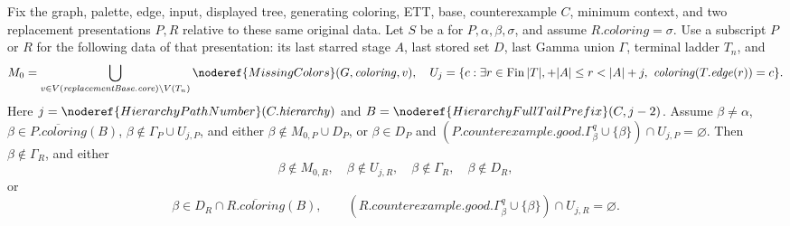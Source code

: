 \begin{lemma}
Fix the graph, palette, edge, input, displayed tree, generating coloring,
ETT, base, counterexample \(C\), minimum context, and two replacement
presentations \(P,R\) relative to these same original data.
Let \(S\) be a  for
\(P,\alpha,\beta,\sigma\), and assume \(R.\mathit{coloring}=\sigma\).
Use a subscript \(P\) or \(R\) for the following data of that
presentation: its last starred stage \(A\), last stored set \(D\),
last Gamma union \(\Gamma\), terminal ladder \(T_n\), and
\[
 M_0=\bigcup_{v\in V(\mathit{replacementBase.core})\setminus V(T_n)}
 \noderef{MissingColors}(G,\mathit{coloring},v),\quad
 U_j=\{c:\exists r\in\operatorname{Fin}|T|,+ |A|\le r<|A|+j,\ \mathit{coloring}(T.\mathit{edge}(r))=c\}.
\]
Here \(j=\noderef{HierarchyPathNumber}(C.\mathit{hierarchy})\) and
\(B=\noderef{HierarchyFullTailPrefix}(C,j-2)\).
Assume \(\beta\ne\alpha\), \(\beta\in\overline{P.\mathit{coloring}}(B)\),
\(\beta\notin\Gamma_P\cup U_{j,P}\), and either
\(\beta\notin M_{0,P}\cup D_P\), or
\(\beta\in D_P\) and
\((P.\mathit{counterexample.good}.\Gamma^q_\beta\cup\{\beta\})
\cap U_{j,P}=\varnothing\).
Then \(\beta\notin\Gamma_R\), and either
\[
 \beta\notin M_{0,R},\quad\beta\notin U_{j,R},\quad
 \beta\notin\Gamma_R,\quad\beta\notin D_R,
\]
or
\[
 \beta\in D_R\cap\overline{R.\mathit{coloring}}(B),\qquad
 (R.\mathit{counterexample.good}.\Gamma^q_\beta\cup\{\beta\})
 \cap U_{j,R}=\varnothing.
\]
\end{lemma}
